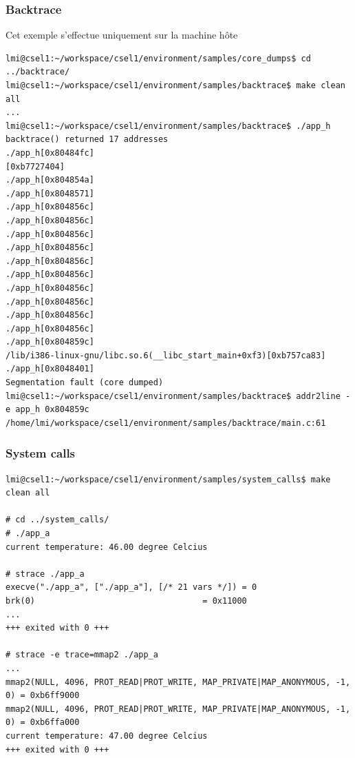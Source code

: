 \subsubsection{Backtrace}
Cet exemple s'effectue uniquement sur la machine hôte
\begin{lstlisting}
lmi@csel1:~/workspace/csel1/environment/samples/core_dumps$ cd ../backtrace/
lmi@csel1:~/workspace/csel1/environment/samples/backtrace$ make clean all
...
lmi@csel1:~/workspace/csel1/environment/samples/backtrace$ ./app_h
backtrace() returned 17 addresses
./app_h[0x80484fc]
[0xb7727404]
./app_h[0x804854a]
./app_h[0x8048571]
./app_h[0x804856c]
./app_h[0x804856c]
./app_h[0x804856c]
./app_h[0x804856c]
./app_h[0x804856c]
./app_h[0x804856c]
./app_h[0x804856c]
./app_h[0x804856c]
./app_h[0x804856c]
./app_h[0x804856c]
./app_h[0x804859c]
/lib/i386-linux-gnu/libc.so.6(__libc_start_main+0xf3)[0xb757ca83]
./app_h[0x8048401]
Segmentation fault (core dumped)
lmi@csel1:~/workspace/csel1/environment/samples/backtrace$ addr2line -e app_h 0x804859c
/home/lmi/workspace/csel1/environment/samples/backtrace/main.c:61

\end{lstlisting}
\subsubsection{System calls}
\begin{lstlisting}
lmi@csel1:~/workspace/csel1/environment/samples/system_calls$ make clean all

# cd ../system_calls/
# ./app_a
current temperature: 46.00 degree Celcius

# strace ./app_a
execve("./app_a", ["./app_a"], [/* 21 vars */]) = 0
brk(0)                                  = 0x11000
...
+++ exited with 0 +++

# strace -e trace=mmap2 ./app_a
...
mmap2(NULL, 4096, PROT_READ|PROT_WRITE, MAP_PRIVATE|MAP_ANONYMOUS, -1, 0) = 0xb6ff9000
mmap2(NULL, 4096, PROT_READ|PROT_WRITE, MAP_PRIVATE|MAP_ANONYMOUS, -1, 0) = 0xb6ffa000
current temperature: 47.00 degree Celcius
+++ exited with 0 +++
\end{lstlisting}

